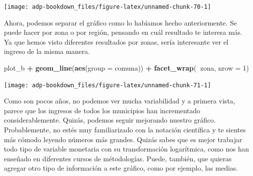 \documentclass[]{book}
\newenvironment{Shaded}{\begin{snugshade}}{\end{snugshade}}
\newcommand{\DataTypeTok}[1]{\textcolor[rgb]{0.13,0.29,0.53}{#1}}
\newcommand{\DecValTok}[1]{\textcolor[rgb]{0.00,0.00,0.81}{#1}}
\newcommand{\KeywordTok}[1]{\textcolor[rgb]{0.13,0.29,0.53}{\textbf{#1}}}
\newcommand{\NormalTok}[1]{#1}
\newcommand{\OperatorTok}[1]{\textcolor[rgb]{0.81,0.36,0.00}{\textbf{#1}}}
\newcommand{\StringTok}[1]{\textcolor[rgb]{0.31,0.60,0.02}{#1}}
\begin{document}
\begin{Shaded}
\end{Shaded}

\begin{center}\texttt{[image: adp-bookdown\_files/figure-latex/unnamed-chunk-70-1]} \end{center}

Ahora, podemos separar el gráfico como lo habíamos hecho anteriormente.
Se puede hacer por zona o por región, pensando en cuál resultado te
interesa más. Ya que hemos visto diferentes resultados por zonas, sería
interesante ver el ingreso de la misma manera.

\begin{Shaded}
\begin{Highlighting}[]
\NormalTok{plot_b }\OperatorTok{+}\StringTok{ }
\StringTok{  }\KeywordTok{geom_line}\NormalTok{(}\KeywordTok{aes}\NormalTok{(}\DataTypeTok{group =}\NormalTok{ comuna)) }\OperatorTok{+}
\StringTok{  }\KeywordTok{facet_wrap}\NormalTok{(}\OperatorTok{~}\NormalTok{zona, }\DataTypeTok{nrow =} \DecValTok{1}\NormalTok{)}
\end{Highlighting}
\end{Shaded}

\begin{center}\texttt{[image: adp-bookdown\_files/figure-latex/unnamed-chunk-71-1]} \end{center}

Como son pocos años, no podemos ver mucha variabilidad y a primera
vista, parece que los ingresos de todos los municipios han incrementado
considerablemente. Quizás, podemos seguir mejorando nuestro gráfico.
Probablemente, no estés muy familiarizado con la notación científica y
te sientes más cómodo leyendo números más grandes. Quizás sabes que es
mejor trabajar todo tipo de variable monetaria con su transformación
logarítmica, como nos han enseñado en diferentes cursos de métodologías.
Puede, también, que quieras agregar otro tipo de información a este
gráfico, como por ejemplo, las medias.
\end{document}
